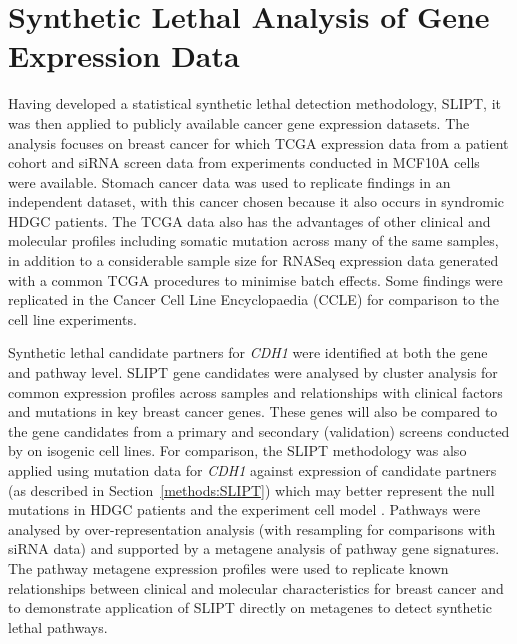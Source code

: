 \chapter{Synthetic Lethal Analysis of Gene Expression Data}
\label{chap:SLIPT}

Having developed a statistical synthetic lethal detection methodology, \gls{SLIPT}, it was then applied to publicly available cancer gene expression datasets. The analysis focuses on breast cancer for which  \gls{TCGA} expression data \citep{TCGA2012} from a patient cohort and \gls{siRNA} screen data \citep{Telford2015} from experiments conducted in MCF10A cells were available. Stomach cancer data \citep{TCGA2014GC} was used to replicate findings in an independent dataset, with this cancer chosen because it also occurs in syndromic \gls{HDGC} patients. The \gls{TCGA} data also has the advantages of other clinical and molecular profiles including somatic mutation across many of the same samples, in addition to a considerable sample size for RNASeq expression data generated with a common \gls{TCGA} procedures to minimise batch effects. Some findings were replicated in the Cancer Cell Line Encyclopaedia (CCLE) \citep{Barretina2012} for comparison to the cell line experiments.

Synthetic lethal candidate partners for \textit{CDH1} were identified at both the gene and pathway level. \gls{SLIPT} gene candidates were analysed by cluster analysis for common expression profiles across samples and relationships with clinical factors and mutations in key breast cancer genes. These genes will also be compared to the gene candidates from a primary and secondary (validation) screens conducted by \citet{Telford2015} on isogenic cell lines. For comparison, the \gls{SLIPT} methodology was also applied using mutation data for \textit{CDH1} against expression of candidate partners (as described in Section~\ref{methods:SLIPT}) which may better represent the null mutations in HDGC patients and the experiment cell model \citep{Chen2014}. Pathways were analysed by over-representation analysis (with resampling for comparisons with \gls{siRNA} data) and supported by a metagene analysis of pathway gene signatures. The pathway metagene expression profiles were used to replicate known relationships between clinical and molecular characteristics for breast cancer and to demonstrate application of \gls{SLIPT} directly on metagenes to detect synthetic lethal pathways.

